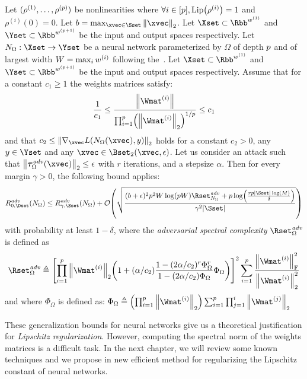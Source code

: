 \begin{theorem}
  Let $(\rho^{(1)}, \dots, \rho^{(p)})$ be nonlinearities where $\forall i \in [\depth], \lip{\rho^{(i)}} = 1$ and $\rho^{(i)}(0) = 0$.
  Let $b = \max_{\xvec \in \Sset} \norm{\xvec}_2$.
  Let $\Xset \subset \Rbb^{\dimw^{(1)}}$ and $\Yset \subset \Rbb^{\dimw^{(\depth+1)}}$ be the input and output spaces respectively.
  Let $N_\Omega: \Xset \rightarrow \Yset$ be a neural network parameterized by $\Omega$ of depth $p$ and of largest width $W = \max_i w^{(i)}$ following the~.
  Let $\Xset \subset \Rbb^{\dimw^{(1)}}$ and $\Yset \subset \Rbb^{\dimw^{(\depth+1)}}$ be the input and output spaces respectively.
  Assume that for a constant $c_1 \geq 1$ the weights matrices satisfy:
  \begin{equation}
    \frac{1}{c_1} \leq \frac{\norm{\Wmat^{(i)}}}{\prod_{i=1}^\depth \left(\norm{\Wmat^{(i)}}_2\right)^{1/\depth}} \leq c_1
  \end{equation}
  and that $c_2 \leq \norm{\nabla_\xvec L(N_\Omega(\xvec), y)}_2$ holds for a constant $c_2 > 0$, any $y \in \Yset$ and any $\xvec \in \Bset_2(\xvec, \epsilon)$.
  Let us consider an attack such that $\norm{\adv^{\text{\emph{adv}}}_\Omega(\xvec)}_2 \leq \epsilon$ with $r$ iterations, and a stepsize $\alpha$.
  Then for every margin $\gamma > 0$, the following bound applies:
  \begin{equation}
    R_{0, \Dset}^{\text{\emph{adv}}}(N_\Omega) \leq R_{\gamma, \Sset}^{\text{\emph{adv}}}(N_\Omega) + \bigO \left( \sqrt{\frac{(b + \epsilon)^2 \depth^2 W \log(\depth W) \Rset^{\text{\emph{adv}}}_{N_\Omega} + \depth \log(\frac{r \depth |\Sset| \log(M)}{\delta})}{\gamma^2 |\Sset|}} \right)
  \end{equation}
  with probability at least $1 - \delta$, where the \emph{adversarial spectral complexity} $\Rset^{\text{\emph{adv}}}_{\Omega}$ is defined as
  \begin{equation}
    \Rset^{\text{\emph{adv}}}_{\Omega} \triangleq \left[ \prod_{i=1}^\depth \norm{\Wmat^{(i)}}_2 \left( 1 + (\alpha / c_2) \frac{1 - (2\alpha/c_2)^r \Phi_\Omega^r }{1 - (2\alpha/c_2) \Phi_\Omega } \Phi_\Omega  \right) \right]^2 \sum_{i = 1}^\depth \frac{\norm{\Wmat^{(i)}}_\fro^2}{\norm{\Wmat^{(i)}}_2^2}
  \end{equation}
  and where $\Phi_\Omega$ is defined as: $\Phi_\Omega \triangleq \left(\prod_{i=1}^\depth \norm{\Wmat^{(i)}}_2 \right) \sum_{i=1}^\depth \prod_{j=1}^{i} \norm{\Wmat^{(j)}}_2$
\end{theorem}

These generalization bounds for neural networks give us a theoretical justification for \emph{Lipschitz regularization}.
However, computing the spectral norm of the weights matrices is a difficult task.
In the next chapter, we will review some known techniques and we propose in  new efficient method for regularizing the Lipschitz constant of neural networks.






